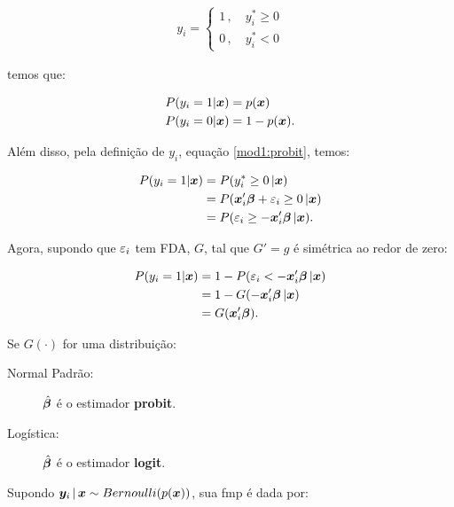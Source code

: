 \documentclass[11pt, oneside, a4paper, article]{article}
\numberwithin{equation}{section}
\begin{document}
\begin{description}
	\vspace{-1 em}
	\begin{align*}
		y_{i} =
		\begin{cases}
			1 \, , \quad y^{*}_{i} \geq 0
			\\
			0 \, , \quad y^{*}_{i} < 0
		\end{cases}
	\end{align*}

	\noindent
	temos que:

	\vspace{-1 em}
	\begin{align*}
		P( y_{i} = 1 | \boldsymbol{x} ) &= p( \boldsymbol{x} )
		\\
		P( y_{i} = 0 | \boldsymbol{x} ) &= 1 - p( \boldsymbol{x} ).
	\end{align*}

	Além disso, pela definição de $y_{i}$, equação \eqref{mod1:probit}, temos:

	\vspace{-1 em}
	\begin{align*}
		P( y_{i} = 1 | \boldsymbol{x} ) &= P(y_{i}^{*} \geq 0 \, | \boldsymbol{x} )
		\\
		&= P( \boldsymbol{x}_{i}' \boldsymbol{\beta} + \varepsilon_{i} \geq 0 \, | \boldsymbol{x} )
		\\
		&= P( \varepsilon_{i} \geq - \boldsymbol{x}_{i}' \boldsymbol{\beta}  \, | \boldsymbol{x} ).
	\end{align*}

	\noindent
	Agora, supondo que $\varepsilon_{i}$ tem FDA, $G$, tal que $G'=g$ é simétrica ao redor de zero:

	\vspace{-1 em}
	\begin{align*}
		P( y_{i} = 1 | \boldsymbol{x} ) 
		&= 1 - P( \varepsilon_{i} < - \boldsymbol{x}_{i}' \boldsymbol{\beta}  \, | \boldsymbol{x} )
		\\
		&= 1 - G( - \boldsymbol{x}_{i}' \boldsymbol{\beta}  \, | \boldsymbol{x} )
		\\
		&= G( \boldsymbol{x}_{i}' \boldsymbol{\beta} ).
	\end{align*}

	Se $G(\cdot)$ for uma distribuição:

	\begin{description}
		\item [Normal Padrão:] $\hat{\boldsymbol{\beta}}$ é o estimador \textbf{probit}.
		\item [Logística:] $\hat{\boldsymbol{\beta}}$ é o estimador \textbf{logit}.
	\end{description}

	Supondo $\boldsymbol{y}_{i} \, | \, \boldsymbol{x} \sim Bernoulli(p(\boldsymbol{x}))$, sua fmp é dada por:


\end{description}
\end{document}
